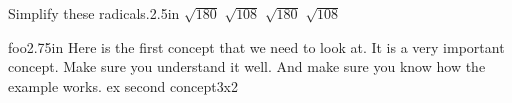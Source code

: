 \begin{myProblems4}{Simplify these radicals.}{2.5in}
    {
        $\sqrt{180}$ %
    }
    {
        $\sqrt{108}$ %
    }
    {
        $\sqrt{180}$ %
    }
    {
        $\sqrt{108}$ %
    }
\end{myProblems4}

\begin{myConceptWithExamples2}{foo}{2.75in}
    {
        Here is the first concept that we need to look at.
        It is a very important concept.
        Make sure you understand it well.
        And make sure you know how the example works.
    }{ex}
    {second concept}{3x2}
\end{myConceptWithExamples2}
%
